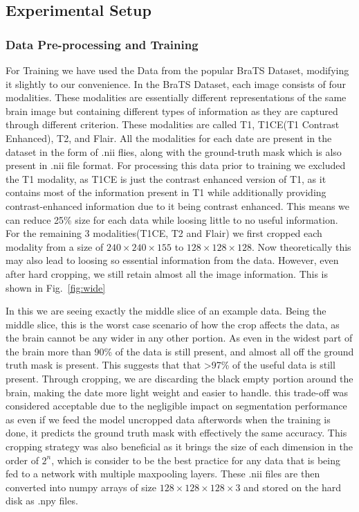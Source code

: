 \documentclass[a4paper,fleqn]{cas-dc}
\begin{document}
\subsection{Experimental Setup}

\subsubsection{Data Pre-processing and Training}

For Training we have used the Data from the popular BraTS Dataset, modifying it slightly to our convenience. In the BraTS Dataset, each image consists of four modalities. These modalities are essentially different representations of the same brain image but containing different types of information as they are captured through different criterion. These modalities are called T1, T1CE(T1 Contrast Enhanced), T2, and Flair. All the modalities for each date are present in the dataset in the form of .nii flies, along with the ground-truth mask which is also present in .nii file format. For processing this data prior to training we excluded the T1 modality, as T1CE is just the contrast enhanced version of T1, as it contains most of the information present in T1 while additionally providing contrast-enhanced information due to it being contrast enhanced. This means we can reduce 25\% size for each data while loosing little to no useful information. For the remaining 3 modalities(T1CE, T2 and Flair) we first cropped each modality from a size of $240\times240\times155$ to $128\times128\times128$. Now theoretically this may also lead to loosing so essential information from the data. However, even after hard cropping, we still retain almost all the image information. This is shown in Fig.~\ref{fig:wide}

In this we are seeing exactly the middle slice of an example data. Being the middle slice, this is the worst case scenario of how the crop affects the data, as the brain cannot be any wider in any other portion. As even in the widest part of the brain more than 90\% of the data is still present, and almost all off the ground truth mask is present. This suggests that that >97\% of the useful data is still present. Through cropping, we are discarding the black empty portion around the brain, making the date more light weight and easier to handle. this trade-off was considered acceptable due to the negligible impact on segmentation performance as even if we feed the model uncropped data afterwords when the training is done, it predicts the ground truth mask with effectively the same accuracy. This cropping strategy was also beneficial as it brings the size of each dimension in the order of $2^n$, which is consider to be the best practice for any data that is being fed to a network with multiple maxpooling layers. These .nii files are then converted into numpy arrays of size $128\times128\times128\times3$ and stored on the hard disk as .npy files.
\end{document}
